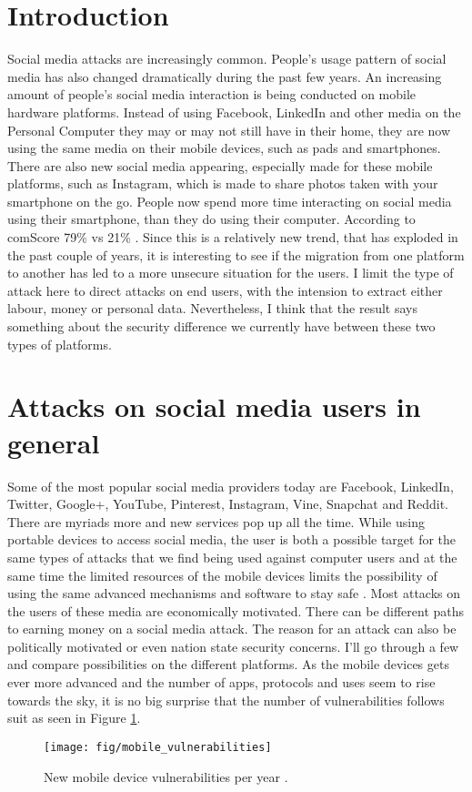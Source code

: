 \section{Introduction}
Social media attacks are increasingly common. People’s usage pattern of social media has also changed dramatically during the past few years. An increasing amount of people’s social media interaction is being conducted on mobile hardware platforms. Instead of using Facebook, LinkedIn and other media on the Personal Computer they may or may not still have in their home, they are now using the same media on their mobile devices, such as pads and smartphones. There are also new social media appearing, especially made for these mobile platforms, such as Instagram, which is made to share photos taken with your smartphone on the go.
People now spend more time interacting on social media using their smartphone, than they do using their computer. According to comScore 79\% vs 21\% \cite{CrossPlatform2016}. Since this is a relatively new trend, that has exploded in the past couple of years, it is interesting to see if the migration from one platform to another has led to a more unsecure situation for the users. I limit the type of attack here to direct attacks on end users, with the intension to extract either labour, money or personal data. Nevertheless, I think that the result says something about the security difference we currently have between these two types of platforms.
\section{Attacks on social media users in general}
Some of the most popular social media providers today are Facebook, LinkedIn, Twitter, Google+, YouTube, Pinterest, Instagram, Vine, Snapchat and Reddit. There are myriads more and new services pop up all the time.
While using portable devices to access social media, the user is both a possible target for the same types of attacks that we find being used against computer users and at the same time the limited resources of the mobile devices limits the possibility of using the same advanced mechanisms and software to stay safe \cite{Zonouz2013215}.
Most attacks on the users of these media are economically motivated. There can be different paths to earning money on a social media attack. The reason for an attack can also be politically motivated or even nation state security concerns. I’ll go through a few and compare possibilities on the different platforms.
As the mobile devices gets ever more advanced and the number of apps, protocols and uses seem to rise towards the sky, it is no big surprise that the number of vulnerabilities follows suit as seen in Figure \ref{fig:mobile_vulnerabilities}.
\begin{figure}
\centering
\texttt{[image: fig/mobile\_vulnerabilities]}
\caption{New mobile device vulnerabilities per year \cite{ISTR2016}.\label{fig:mobile_vulnerabilities}}
\end{figure}
